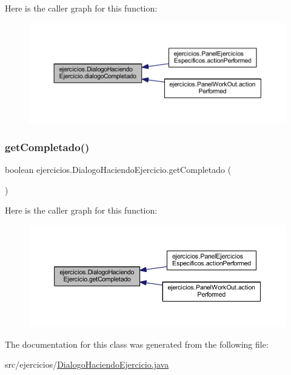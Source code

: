Here is the caller graph for this function\+:
\nopagebreak
\begin{figure}[H]
\begin{center}
\leavevmode
\includegraphics[width=350pt]{classejercicios_1_1_dialogo_haciendo_ejercicio_a3178de5a2ceb6cc8c392312799ced5c7_icgraph}
\end{center}
\end{figure}
\mbox{\label{classejercicios_1_1_dialogo_haciendo_ejercicio_a97a3810d8067e62084728c06011d89d7}} 
\subsubsection{\texorpdfstring{get\+Completado()}{getCompletado()}}
{\footnotesize\ttfamily boolean ejercicios.\+Dialogo\+Haciendo\+Ejercicio.\+get\+Completado (\begin{DoxyParamCaption}{ }\end{DoxyParamCaption})}

Here is the caller graph for this function\+:
\nopagebreak
\begin{figure}[H]
\begin{center}
\leavevmode
\includegraphics[width=350pt]{classejercicios_1_1_dialogo_haciendo_ejercicio_a97a3810d8067e62084728c06011d89d7_icgraph}
\end{center}
\end{figure}


The documentation for this class was generated from the following file\+:\begin{DoxyCompactItemize}
\item 
src/ejercicios/\mbox{\hyperlink{_dialogo_haciendo_ejercicio_8java}{Dialogo\+Haciendo\+Ejercicio.\+java}}\end{DoxyCompactItemize}
